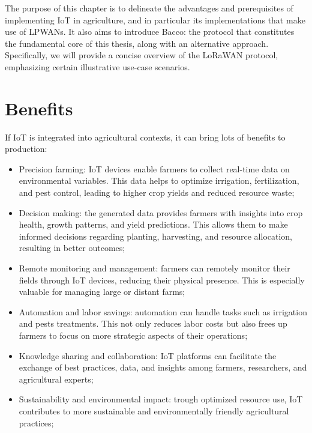 The purpose of this chapter is to delineate the advantages and prerequisites of implementing \gls{IoT} in agriculture,
and in particular its implementations that make use of \glspl{LPWAN}. It also aims to introduce Bacco: the
protocol that constitutes the fundamental core of this thesis, along with an alternative approach.
Specifically, we will provide a concise overview of the \gls{LoRaWAN} protocol, emphasizing certain illustrative
use-case scenarios.

\section{Benefits}
\label{sec: benefits}
If \gls{IoT} is integrated into agricultural contexts, it can bring lots of benefits to production:
\begin{itemize}
    \item Precision farming: IoT devices enable farmers to collect real-time data on environmental variables. This data
        helps to optimize irrigation, fertilization, and pest control, leading to higher crop yields and reduced resource
        waste;
    \item Decision making: the generated data provides farmers with insights into crop health, growth
        patterns, and yield predictions. This allows them to make informed decisions regarding planting, harvesting, and
        resource allocation, resulting in better outcomes;
    \item Remote monitoring and management: farmers can remotely monitor their fields through IoT devices,
        reducing their physical presence. This is especially valuable for managing large or distant
        farms;
    \item Automation and labor savings: automation can handle tasks such as irrigation and pests
        treatments. This not only reduces labor costs but also frees up farmers to focus on more strategic aspects of
        their operations;
    \item Knowledge sharing and collaboration: IoT platforms can facilitate the exchange of best practices, data, and
        insights among farmers, researchers, and agricultural experts;
    \item Sustainability and environmental impact: trough optimized resource use, IoT contributes to more sustainable
        and environmentally friendly agricultural practices;
\end{itemize}

